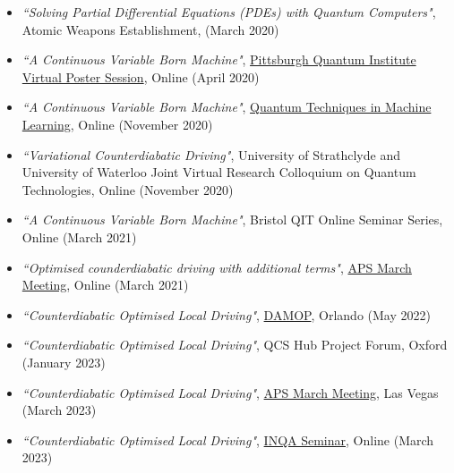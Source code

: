 \begin{itemize}
    \item \textit{``Solving Partial Differential Equations (PDEs) with Quantum Computers"}, Atomic Weapons Establishment, (March 2020)
    \item \textit{``A Continuous Variable Born Machine"}, \href{https://www.youtube.com/live/ImQeEs0BcQs?feature=share&t=1996}{Pittsburgh Quantum Institute Virtual Poster Session}, Online (April 2020)
    \item \textit{``A Continuous Variable Born Machine"}, \href{https://www.youtube.com/watch?v=6v1IiXRToPU&t=3685s}{Quantum Techniques in Machine Learning}, Online (November 2020)
    \item \textit{``Variational Counterdiabatic Driving"}, University of Strathclyde and University of Waterloo Joint Virtual Research Colloquium on Quantum Technologies, Online (November 2020)
    \item \textit{``A Continuous Variable Born Machine"}, Bristol QIT Online Seminar Series, Online (March 2021)
    \item \textit{``Optimised counderdiabatic driving with additional terms"}, \href{https://meetings.aps.org/Meeting/MAR21/Session/S21.8}{APS March Meeting}, Online (March 2021)
    \item \textit{``Counterdiabatic Optimised Local Driving"}, \href{https://www.youtube.com/watch?v=YkoCPIlFl70}{DAMOP}, Orlando (May 2022)
    \item \textit{``Counterdiabatic Optimised Local Driving"}, QCS Hub Project Forum, Oxford (January 2023)
    \item \textit{``Counterdiabatic Optimised Local Driving"}, \href{https://meetings.aps.org/Meeting/MAR23/Session/Q71.8}{APS March Meeting}, Las Vegas (March 2023)
    \item \textit{``Counterdiabatic Optimised Local Driving"}, \href{https://youtu.be/-btmXDNaQX4}{INQA Seminar}, Online (March 2023)
\end{itemize}